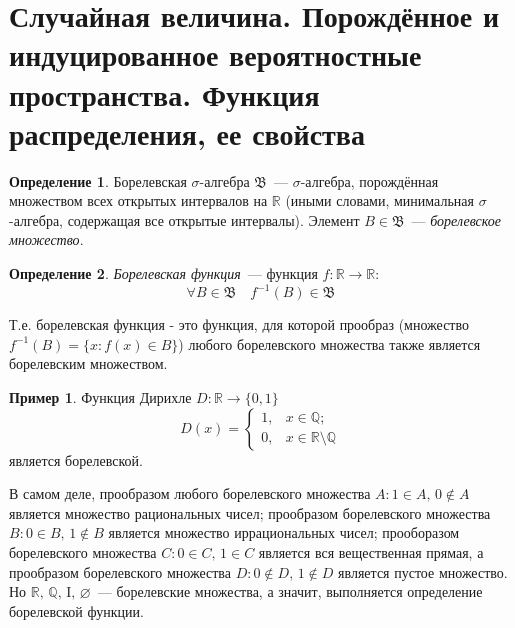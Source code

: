 \documentclass[oneside,final,14pt]{extreport}
\theoremstyle{plain}
\theoremstyle{definition}
\newtheorem*{defn}{Определение}
\newtheorem*{exmp}{Пример}
\theoremstyle{named}
\begin{document}
\section{Случайная величина. Порождённое и индуцированное вероятностные пространства. Функция распределения, ее свойства}

\begin{defn}
    {\it $\text{Борелевская~} \sigma \text{-алгебра~} \mathfrak{B}$}~--- $\sigma \text{-алгебра}$, порождённая множеством всех открытых интервалов на $\mathbb{R}$ (иными словами, минимальная $\sigma$-алгебра, содержащая все открытые интервалы). Элемент $B \in \mathfrak{B}$~--- {\it борелевское множество}.
\end{defn}

\begin{defn}
    {\it Борелевская функция}~--- функция $f: \mathbb{R} \rightarrow \mathbb{R}$:
    \begin{equation*}
        \forall B \in \mathfrak{B} \quad f^{-1}(B) \in \mathfrak{B}
    \end{equation*}
    
    Т.е. борелевская функция - это функция, для которой прообраз (множество $f^{-1}(B) = \{x \colon f(x) \in B\}$) любого борелевского множества также является борелевским множеством.
\end{defn}

\begin{exmp}
    Функция Дирихле $D: \mathbb{R} \rightarrow \{0,1\}$
    \begin{equation*}
        D(x) =
        \begin{cases}
            1, & x \in \mathbb{Q}; \\
            0, & x \in \mathbb{R} \setminus \mathbb{Q}
        \end{cases}
    \end{equation*}
является борелевской. 

В самом деле, прообразом любого борелевского множества ${A \colon 1 \in A, \, 0 \notin A}$ является множество рациональных чисел; прообразом борелевского множества ${B \colon 0 \in B, \, 1 \notin B}$ является множество иррациональных чисел; прооборазом борелевского множества ${C \colon 0 \in C, \, 1 \in C}$ является вся вещественная прямая, а прообразом борелевского множества ${D \colon 0 \notin D, \, 1 \notin D}$ является пустое множество. Но $\mathbb{R}, \, \mathbb{Q}, \, \mathrm{I}, \, \varnothing $~--- борелевские множества, а значит, выполняется определение борелевской функции.
\end{exmp}
\end{document}
